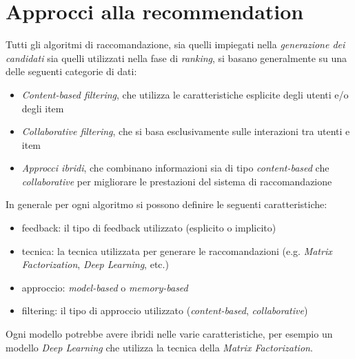 \section{Approcci alla recommendation}

Tutti gli algoritmi di raccomandazione, sia quelli impiegati nella \textit{generazione dei candidati} sia quelli utilizzati nella fase di \textit{ranking}, si basano generalmente su una delle seguenti categorie di dati:

\begin{itemize}
    \item \textit{Content-based filtering}, che utilizza le caratteristiche esplicite degli utenti e/o degli item
    \item \textit{Collaborative filtering}, che si basa esclusivamente sulle interazioni tra utenti e item
    \item \textit{Approcci ibridi}, che combinano informazioni sia di tipo \textit{content-based} che \textit{collaborative} per migliorare le prestazioni del sistema di raccomandazione
\end{itemize}

In generale per ogni algoritmo si possono definire le seguenti caratteristiche:

\begin{itemize}
    \item feedback: il tipo di feedback utilizzato (esplicito o implicito)
    \item tecnica: la tecnica utilizzata per generare le raccomandazioni (e.g. \textit{Matrix Factorization}, \textit{Deep Learning}, etc.)
    \item approccio: \textit{model-based} o \textit{memory-based}
    \item filtering: il tipo di approccio utilizzato (\textit{content-based}, \textit{collaborative})
\end{itemize}

Ogni modello potrebbe avere ibridi nelle varie caratteristiche, per esempio un modello \textit{Deep Learning} che utilizza la tecnica della \textit{Matrix Factorization}.


